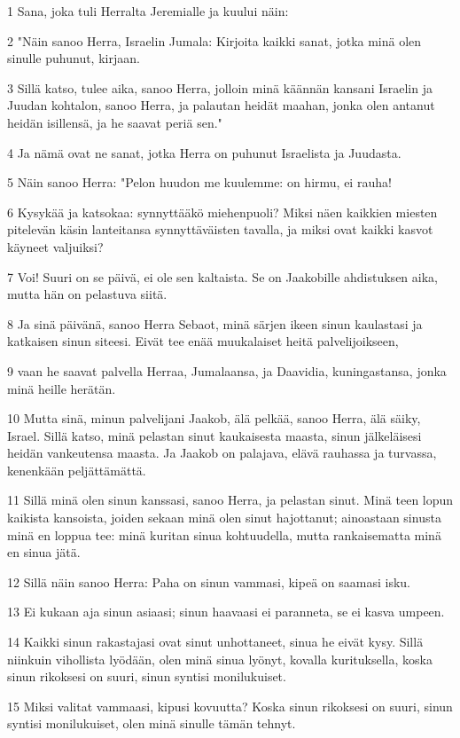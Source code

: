 \par 1 Sana, joka tuli Herralta Jeremialle ja kuului näin:
\par 2 "Näin sanoo Herra, Israelin Jumala: Kirjoita kaikki sanat, jotka minä olen sinulle puhunut, kirjaan.
\par 3 Sillä katso, tulee aika, sanoo Herra, jolloin minä käännän kansani Israelin ja Juudan kohtalon, sanoo Herra, ja palautan heidät maahan, jonka olen antanut heidän isillensä, ja he saavat periä sen."
\par 4 Ja nämä ovat ne sanat, jotka Herra on puhunut Israelista ja Juudasta.
\par 5 Näin sanoo Herra: "Pelon huudon me kuulemme: on hirmu, ei rauha!
\par 6 Kysykää ja katsokaa: synnyttääkö miehenpuoli? Miksi näen kaikkien miesten pitelevän käsin lanteitansa synnyttäväisten tavalla, ja miksi ovat kaikki kasvot käyneet valjuiksi?
\par 7 Voi! Suuri on se päivä, ei ole sen kaltaista. Se on Jaakobille ahdistuksen aika, mutta hän on pelastuva siitä.
\par 8 Ja sinä päivänä, sanoo Herra Sebaot, minä särjen ikeen sinun kaulastasi ja katkaisen sinun siteesi. Eivät tee enää muukalaiset heitä palvelijoikseen,
\par 9 vaan he saavat palvella Herraa, Jumalaansa, ja Daavidia, kuningastansa, jonka minä heille herätän.
\par 10 Mutta sinä, minun palvelijani Jaakob, älä pelkää, sanoo Herra, älä säiky, Israel. Sillä katso, minä pelastan sinut kaukaisesta maasta, sinun jälkeläisesi heidän vankeutensa maasta. Ja Jaakob on palajava, elävä rauhassa ja turvassa, kenenkään peljättämättä.
\par 11 Sillä minä olen sinun kanssasi, sanoo Herra, ja pelastan sinut. Minä teen lopun kaikista kansoista, joiden sekaan minä olen sinut hajottanut; ainoastaan sinusta minä en loppua tee: minä kuritan sinua kohtuudella, mutta rankaisematta minä en sinua jätä.
\par 12 Sillä näin sanoo Herra: Paha on sinun vammasi, kipeä on saamasi isku.
\par 13 Ei kukaan aja sinun asiaasi; sinun haavaasi ei paranneta, se ei kasva umpeen.
\par 14 Kaikki sinun rakastajasi ovat sinut unhottaneet, sinua he eivät kysy. Sillä niinkuin vihollista lyödään, olen minä sinua lyönyt, kovalla kurituksella, koska sinun rikoksesi on suuri, sinun syntisi monilukuiset.
\par 15 Miksi valitat vammaasi, kipusi kovuutta? Koska sinun rikoksesi on suuri, sinun syntisi monilukuiset, olen minä sinulle tämän tehnyt.
